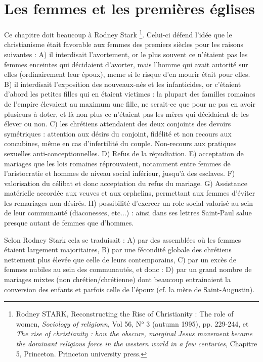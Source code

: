  
 \section{Les femmes et les premières églises}
 
 Ce chapitre doit beaucoup à Rodney Stark
 \footnote{Rodney STARK, Reconstructing the Rise of Christianity : The role of women, \emph{Sociology of religionn}, Vol 56, N° 3 (autumn 1995), pp. 229-244, et \emph{The rise of christianity : how the obscure, marginal Jesus movement became the dominant religious force in the western world in a few centuries}, Chapitre 5, Princeton. Princeton university press.}. 
 Celui-ci défend l'idée que le christianisme  était favorable aux femmes des premiers siècles pour les raisons suivantes : A) il interdisait l'avortement, or le plus souvent ce n'étaient pas les femmes enceintes qui décidaient d'avorter, mais l'homme qui avait autorité sur elles (ordinairement leur époux), meme si le risque d'en mourir était pour elles. B) il interdisait l'exposition des nouveaux-nés et les infanticides, or c'étaient d'abord les petites filles qui en étaient victimes : la plupart des familles romaines de l'empire élevaient au maximum une fille, ne serait-ce que pour ne pas en avoir plusieurs à doter, et là non plus ce n'étaient pas les mères qui décidaient de les élever ou non. C) les chrétiens attendaient des deux conjoints des devoirs symétriques : attention aux désirs du conjoint, fidélité et non recours aux concubines, même en cas d'infertilité du couple. Non-recours aux pratiques sexuelles anti-conceptionnelles. D) Refus de la répudiation. E) acceptation de mariages que les lois romaines réprouvaient, notamment entre femmes de l'aristocratie et hommes de niveau social inférieur, jusqu'à des esclaves. F) valorisation du célibat et donc acceptation du refus du mariage. G) Assistance matérielle accordée aux veuves et aux orphelins, permettant aux femmes d'éviter les remariages non désirés. H) possibilité d'exercer un role social valorisé au sein de leur communauté (diaconesses, etc...) : ainsi dans ses lettres Saint-Paul salue presque autant de femmes que d'hommes.
 
 
 Selon Rodney Stark cela se traduisait : A) par des assemblées où les femmes étaient largement majoritaires, B) par une fécondité globale des chrétiens nettement plus élevée que celle de leurs contemporains, C) par un excès de femmes nubiles au sein des communautés, et donc : D) par un grand nombre de mariages mixtes (non chrétien/chrétienne) dont beaucoup entrainaient la conversion des enfants et parfois celle de l'époux (cf. la mère de Saint-Augustin). 
 
